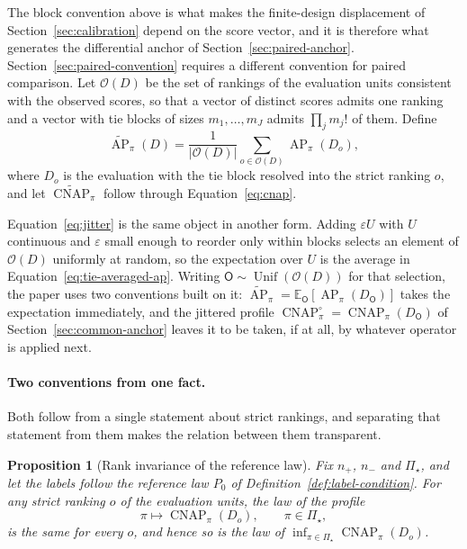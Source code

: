 \documentclass[11pt]{article}
\newcommand{\AP}{\operatorname{AP}}
\newcommand{\CNAP}{\operatorname{CNAP}}
\newcommand{\PSet}{\Pi_\star}
\newcommand{\E}{\mathbb{E}}
\newcommand{\APta}{\widetilde{\AP}}
\newcommand{\CNAPta}{\widetilde{\CNAP}}
\newcommand{\Rank}{\mathsf{O}}
\newcommand{\CNAPj}{\CNAP^{\circ}}
\newcommand{\Unif}{\operatorname{Unif}}
\newtheorem{proposition}{Proposition}
\theoremstyle{remark}
\begin{document}
The block convention above is what makes the finite-design displacement of Section~\ref{sec:calibration} depend on the score vector, and it is therefore what generates the differential anchor of Section~\ref{sec:paired-anchor}. Section~\ref{sec:paired-convention} requires a different convention for paired comparison. Let $\mathcal{O}(D)$ be the set of rankings of the evaluation units consistent with the observed scores, so that a vector of distinct scores admits one ranking and a vector with tie blocks of sizes $m_1,\ldots,m_J$ admits $\prod_j m_j!$ of them. Define
\begin{equation}
\APta_\pi(D)
=
\frac{1}{|\mathcal{O}(D)|}
\sum_{o\in\mathcal{O}(D)}
\AP_\pi(D_o),
\label{eq:tie-averaged-ap}
\end{equation}
where $D_o$ is the evaluation with the tie block resolved into the strict ranking $o$, and let $\CNAPta_\pi$ follow through Equation~\eqref{eq:cnap}.

Equation~\eqref{eq:jitter} is the same object in another form. Adding $\varepsilon U$ with $U$ continuous and $\varepsilon$ small enough to reorder only within blocks selects an element of $\mathcal{O}(D)$ uniformly at random, so the expectation over $U$ is the average in Equation~\eqref{eq:tie-averaged-ap}. Writing $\Rank\sim\Unif(\mathcal{O}(D))$ for that selection, the paper uses two conventions built on it: $\APta_\pi=\E_{\Rank}[\AP_\pi(D_{\Rank})]$ takes the expectation immediately, and the jittered profile $\CNAPj_\pi=\CNAP_\pi(D_{\Rank})$ of Section~\ref{sec:common-anchor} leaves it to be taken, if at all, by whatever operator is applied next.

\paragraph{Two conventions from one fact.}
Both follow from a single statement about strict rankings, and separating that statement from them makes the relation between them transparent.

\begin{proposition}[Rank invariance of the reference law]
\label{prop:rank-invariance}
Fix $n_+$, $n_-$ and $\PSet$, and let the labels follow the reference law $P_0$ of Definition~\ref{def:label-condition}. For any strict ranking $o$ of the evaluation units, the law of the profile
\[
\pi\longmapsto\CNAP_\pi(D_o),
\qquad
\pi\in\PSet,
\]
is the same for every $o$, and hence so is the law of $\inf_{\pi\in\PSet}\CNAP_\pi(D_o)$.
\end{proposition}
\end{document}

